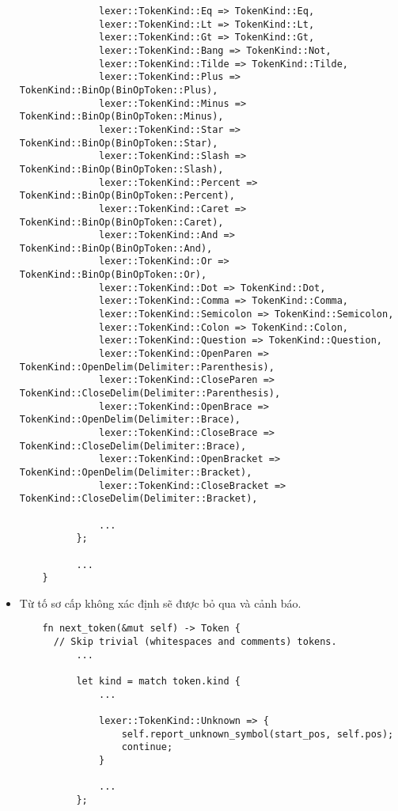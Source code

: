 \begin{itemize}
\begin{lstlisting}
              lexer::TokenKind::Eq => TokenKind::Eq,
              lexer::TokenKind::Lt => TokenKind::Lt,
              lexer::TokenKind::Gt => TokenKind::Gt,
              lexer::TokenKind::Bang => TokenKind::Not,
              lexer::TokenKind::Tilde => TokenKind::Tilde,
              lexer::TokenKind::Plus => TokenKind::BinOp(BinOpToken::Plus),
              lexer::TokenKind::Minus => TokenKind::BinOp(BinOpToken::Minus),
              lexer::TokenKind::Star => TokenKind::BinOp(BinOpToken::Star),
              lexer::TokenKind::Slash => TokenKind::BinOp(BinOpToken::Slash),
              lexer::TokenKind::Percent => TokenKind::BinOp(BinOpToken::Percent),
              lexer::TokenKind::Caret => TokenKind::BinOp(BinOpToken::Caret),
              lexer::TokenKind::And => TokenKind::BinOp(BinOpToken::And),
              lexer::TokenKind::Or => TokenKind::BinOp(BinOpToken::Or),
              lexer::TokenKind::Dot => TokenKind::Dot,
              lexer::TokenKind::Comma => TokenKind::Comma,
              lexer::TokenKind::Semicolon => TokenKind::Semicolon,
              lexer::TokenKind::Colon => TokenKind::Colon,
              lexer::TokenKind::Question => TokenKind::Question,
              lexer::TokenKind::OpenParen => TokenKind::OpenDelim(Delimiter::Parenthesis),
              lexer::TokenKind::CloseParen => TokenKind::CloseDelim(Delimiter::Parenthesis),
              lexer::TokenKind::OpenBrace => TokenKind::OpenDelim(Delimiter::Brace),
              lexer::TokenKind::CloseBrace => TokenKind::CloseDelim(Delimiter::Brace),
              lexer::TokenKind::OpenBracket => TokenKind::OpenDelim(Delimiter::Bracket),
              lexer::TokenKind::CloseBracket => TokenKind::CloseDelim(Delimiter::Bracket),
  
              ...
          };
  
          ...
    }
  \end{lstlisting}
  \item Từ tố sơ cấp không xác định sẽ được bỏ qua và cảnh báo.
  \begin{lstlisting}
    fn next_token(&mut self) -> Token {
      // Skip trivial (whitespaces and comments) tokens.
          ...
  
          let kind = match token.kind {
              ...    
  
              lexer::TokenKind::Unknown => {
                  self.report_unknown_symbol(start_pos, self.pos);
                  continue;
              }
  
              ...
          };
  

\end{lstlisting}
\end{itemize}
